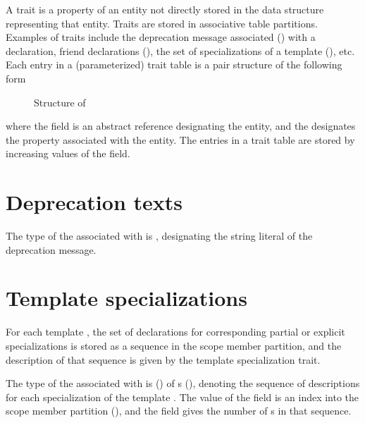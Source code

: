 \label{sec:ifc-traits}

A trait is a property of an entity not directly stored in the data structure representing that entity.
Traits are stored in associative table partitions.  Examples of traits include the deprecation 
message associated () with a declaration,
friend declarations (), the set of specializations of a 
template (), etc.
 Each entry in a (parameterized) trait table is a pair structure of the following form
\begin{figure}[H]
	\centering
	\caption{Structure of }
	\label{fig:ifc-associated-trait-structure}
\end{figure}
%
where the  field is an abstract reference designating the entity, and the  designates the property associated with the entity.
The entries in a trait table are stored by increasing values of the  field.

\section{Deprecation texts}
\label{sec:ifc-deprecated-trait}

The type  of the  associated with  is , designating
the string literal of the deprecation message.




\section{Template specializations}
\label{sec:ifc-specialization-trait}

For each template , the set of declarations for corresponding partial or explicit specializations
is stored as a sequence in the scope member partition, and the description of that sequence is given by the template specialization trait.


The type  of the  associated with  is  ()
of s (),
denoting the sequence of descriptions for each specialization of the template .  The
value of the field  is an index into the scope member partition 
(), and the field  gives the number of s
in that sequence.

